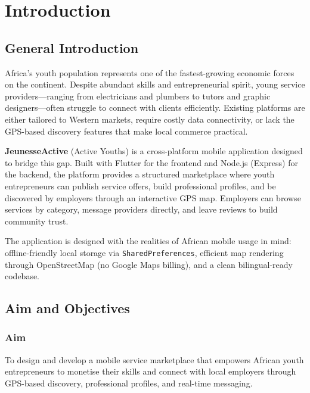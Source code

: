 \documentclass[12pt,a4paper]{report}
\begin{document}
\tableofcontents
\newpage

\chapter{Introduction}

\section{General Introduction}

Africa's youth population represents one of the fastest-growing economic forces on the continent. Despite abundant skills and entrepreneurial spirit, young service providers—ranging from electricians and plumbers to tutors and graphic designers—often struggle to connect with clients efficiently. Existing platforms are either tailored to Western markets, require costly data connectivity, or lack the GPS-based discovery features that make local commerce practical.

\textbf{JeunesseActive} (Active Youths) is a cross-platform mobile application designed to bridge this gap. Built with Flutter for the frontend and Node.js (Express) for the backend, the platform provides a structured marketplace where youth entrepreneurs can publish service offers, build professional profiles, and be discovered by employers through an interactive GPS map. Employers can browse services by category, message providers directly, and leave reviews to build community trust.

The application is designed with the realities of African mobile usage in mind: offline-friendly local storage via \texttt{SharedPreferences}, efficient map rendering through OpenStreetMap (no Google Maps billing), and a clean bilingual-ready codebase.

\section{Aim and Objectives}

\subsection*{Aim}
To design and develop a mobile service marketplace that empowers African youth entrepreneurs to monetise their skills and connect with local employers through GPS-based discovery, professional profiles, and real-time messaging.
\end{document}
